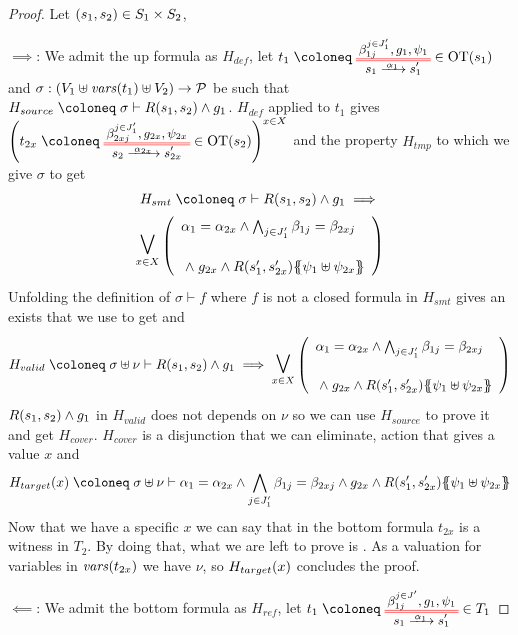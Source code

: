\documentclass{article}
\begin{document}
\begin{proof} Let \({\left(s_1, s_2\right)} \in S_1 \times S_2\),
\item[\(\implies\):] We admit the up formula as \(H_{def}\), let \(t_1 \defobject \OTx{1}{}{1}{1} \in \fOT{s_1}\) and \(\sigma: {\left(V_1 \uplus \mathit{vars}{\left(t_1\right)} \uplus V_2\right)} \to \mathcal{P}\) be such that \(H_{source} \defobject \sigma \vdash R\mpar{s_1, s_2} \wedge g_1\).
	\(H_{def}\) applied to \(t_1\) gives \(\mpar{t_{2x} \defobject \OTx{2}{x}{2x}{1} \in \fOT{s_2}}^{x \in X}\) and the property \(H_{tmp}\) to which we give \(\sigma\) to get
	\begin{multline*}
		H_{smt} \defobject \sigma \vdash R\mpar{s_1, s_2} \wedge g_1 \implies \\
		\operatorname*{\bigsymb{\bigvee}}_{x \in X} \mpar{\begin{array}{l}
			\alpha_1 = \alpha_{2x} \wedge \bigwedge_{j \in J'_1} \beta_{1j} = \beta_{2xj} \\[12pt]
			\nwedge g_{2x} \wedge R\mpar{s'_1, s'_{2x}}\psubst{\psi_1 \uplus \psi_{2x}}
		\end{array}}
	\end{multline*}
	Unfolding the definition of \(\sigma \vdash f\) where \(f\) is not a closed formula in \(H_{smt}\) gives an exists that we use to get  and
	\[ H_{valid} \defobject \sigma \uplus \nu \vdash R\mpar{s_1, s_2} \wedge g_1 \implies \operatorname*{\bigsymb{\bigvee}}_{x \in X} \mpar{\begin{array}{l}
		\alpha_1 = \alpha_{2x} \wedge \bigwedge_{j \in J'_1} \beta_{1j} = \beta_{2xj} \\[12pt]
		\nwedge g_{2x} \wedge R\mpar{s'_1, s'_{2x}}\psubst{\psi_1 \uplus \psi_{2x}}
	\end{array}} \]
	\(R{\left(s_1, s_2\right)} \wedge g_1\) in \(H_{valid}\) does not depends on \(\nu\) so we can use \(H_{source}\) to prove it and get \(H_{cover}\).
	\(H_{cover}\) is a disjunction that we can eliminate, action that gives a value \(x\) and
	\[ H_{target}\mpar{x} \defobject \sigma \uplus \nu \vdash \alpha_1 = \alpha_{2x} \wedge \bigwedge_{j \in J'_1} \beta_{1j} = \beta_{2xj} \wedge g_{2x} \wedge R\mpar{s'_1, s'_{2x}}\psubst{\psi_1 \uplus \psi_{2x}} \]
	Now that we have a specific \(x\) we can say that in the bottom formula \(t_{2x}\) is a witness in \(T_2\).
	By doing that, what we are left to prove is .
	As a valuation for variables in \(\mathit{vars}{\left(t_{2x}\right)}\) we have \(\nu\), so \(H_{target}{\left(x\right)}\) concludes the proof.
\item[\(\impliedby\):] We admit the bottom formula as \(H_{ref}\), let \(t_1 \defobject \OTx{1}{}{1}{} \in T_1\) %
\end{proof}
\end{document}
